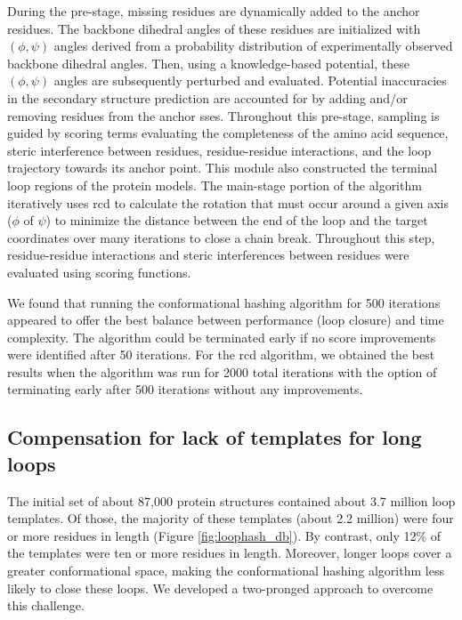 During the pre-stage, missing residues are dynamically added to the anchor residues. The backbone dihedral angles of these residues are initialized with $(\phi, \psi)$ angles derived from a probability distribution of experimentally observed backbone dihedral angles. Then, using a knowledge-based potential, these $(\phi, \psi)$ angles are subsequently perturbed and evaluated. Potential inaccuracies in the secondary structure prediction are accounted for by adding and/or removing residues from the anchor \gls{sse}s. Throughout this pre-stage, sampling is guided by scoring terms evaluating the completeness of the amino acid sequence, steric interference between residues, residue-residue interactions, and the loop trajectory towards its anchor point. This module also constructed the terminal loop regions of the protein models. The main-stage portion of the algorithm iteratively uses \gls{rcd} to calculate the rotation that must occur around a given axis ($\phi$ of $\psi$) to minimize the distance between the end of the loop and the target coordinates over many iterations to close a chain break. Throughout this step, residue-residue interactions and steric interferences between residues were evaluated using scoring functions.

We found that running the conformational hashing algorithm for 500 iterations appeared to offer the best balance between performance (loop closure) and time complexity. The algorithm could be terminated early if no score improvements were identified after 50 iterations. For the \gls{rcd} algorithm, we obtained the best results when the algorithm was run for 2000 total iterations with the option of terminating early after 500 iterations without any improvements.

\subsection{Compensation for lack of templates for long loops}

The initial set of about 87,000 protein structures contained about 3.7 million loop templates. Of those, the majority of these templates (about 2.2 million) were four or more residues in length (Figure \ref{fig:loophash_db}). By contrast, only 12\% of the templates were ten or more residues in length. Moreover, longer loops cover a greater conformational space, making the conformational hashing algorithm less likely to close these loops. We developed a two-pronged approach to overcome this challenge.


